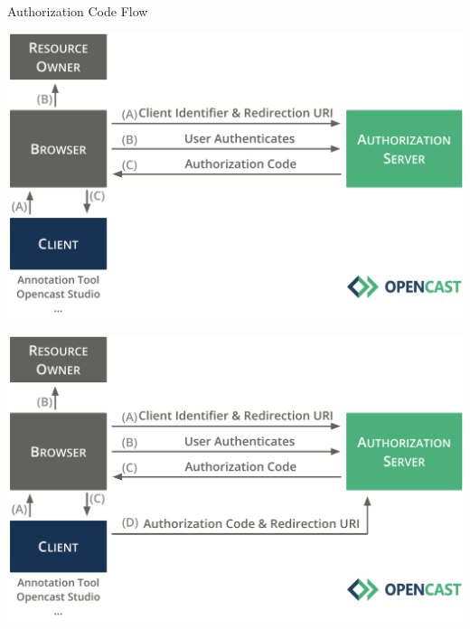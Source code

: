 \documentclass[aspectratio=169]{beamer}
\begin{document}
\begin{frame}{Authorization Code Flow}
	\vspace*{0.5em}
	\begin{overprint}
		\centerline{\includegraphics[height=0.84\textheight]{figures/authorization-code-flow-04}}
		\centerline{\includegraphics[height=0.84\textheight]{figures/authorization-code-flow-05}}
	\end{overprint}
	\vspace{-2em}
\end{frame}
\end{document}
